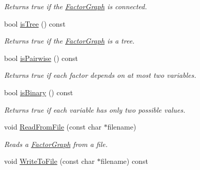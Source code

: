 \begin{CompactItemize}
\begin{CompactList}\small\item\em Returns true if the \hyperlink{classdai_1_1FactorGraph}{FactorGraph} is connected. \item\end{CompactList}\item 
\hypertarget{classdai_1_1FactorGraph_a4e258a9fc003b49491529dfcf45d56a}{
bool \hyperlink{classdai_1_1FactorGraph_a4e258a9fc003b49491529dfcf45d56a}{isTree} () const }
\label{classdai_1_1FactorGraph_a4e258a9fc003b49491529dfcf45d56a}

\begin{CompactList}\small\item\em Returns true if the \hyperlink{classdai_1_1FactorGraph}{FactorGraph} is a tree. \item\end{CompactList}\item 
\hypertarget{classdai_1_1FactorGraph_f1b9c45ee2670aca3d04c2733193f611}{
bool \hyperlink{classdai_1_1FactorGraph_f1b9c45ee2670aca3d04c2733193f611}{isPairwise} () const }
\label{classdai_1_1FactorGraph_f1b9c45ee2670aca3d04c2733193f611}

\begin{CompactList}\small\item\em Returns true if each factor depends on at most two variables. \item\end{CompactList}\item 
\hypertarget{classdai_1_1FactorGraph_f3c0f08798db25845cb518ec6cccbd05}{
bool \hyperlink{classdai_1_1FactorGraph_f3c0f08798db25845cb518ec6cccbd05}{isBinary} () const }
\label{classdai_1_1FactorGraph_f3c0f08798db25845cb518ec6cccbd05}

\begin{CompactList}\small\item\em Returns true if each variable has only two possible values. \item\end{CompactList}\item 
\hypertarget{classdai_1_1FactorGraph_89ee98ae7d3bc1723452e1c11ace4b51}{
void \hyperlink{classdai_1_1FactorGraph_89ee98ae7d3bc1723452e1c11ace4b51}{ReadFromFile} (const char $\ast$filename)}
\label{classdai_1_1FactorGraph_89ee98ae7d3bc1723452e1c11ace4b51}

\begin{CompactList}\small\item\em Reads a \hyperlink{classdai_1_1FactorGraph}{FactorGraph} from a file. \item\end{CompactList}\item 
\hypertarget{classdai_1_1FactorGraph_0916dbc2ac40ad7e5bf0cca9740d3c2c}{
void \hyperlink{classdai_1_1FactorGraph_0916dbc2ac40ad7e5bf0cca9740d3c2c}{WriteToFile} (const char $\ast$filename) const }
\label{classdai_1_1FactorGraph_0916dbc2ac40ad7e5bf0cca9740d3c2c}


\end{CompactItemize}

